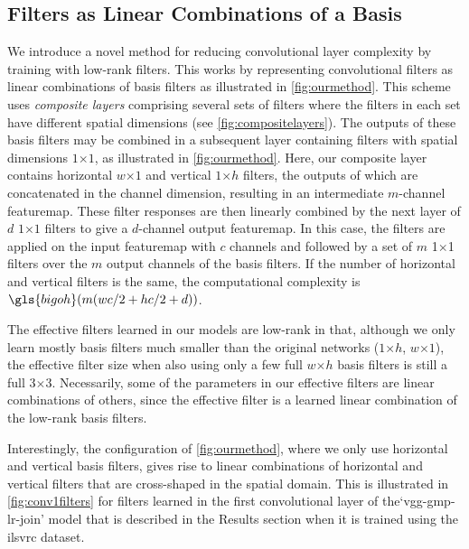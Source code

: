 \documentclass[thesis]{subfiles}
\begin{document}
    \subsection{Filters as Linear Combinations of a Basis}
    We introduce a novel method for reducing convolutional layer complexity by training with low-rank filters. This works by representing convolutional filters as linear combinations of basis filters as illustrated in \cref{fig:ourmethod}. This scheme uses \emph{composite layers} comprising several sets of filters where the filters in each set have different spatial dimensions (see \cref{fig:compositelayers}). The outputs of these basis filters may be combined in a subsequent layer containing filters with spatial dimensions $1$$\times$$1$, as illustrated in \cref{fig:ourmethod}. Here, our composite layer contains horizontal $w$$\times$$1$ and vertical $1$$\times$$h$ filters, the outputs of which are concatenated in the channel dimension, resulting in an intermediate $m$-channel \gls{featuremap}. These filter responses are then linearly combined by the next layer of $d$ $1$$\times$$1$ filters to give a $d$-channel output \gls{featuremap}. In this case, the filters are applied on the input \gls{featuremap} with $c$ channels and followed by a set of $m$ 1$\times$1 filters over the $m$ output channels of the basis filters. If the number of horizontal and vertical filters is the same, the computational complexity is $\gls{bigoh}( m(wc/2 +hc/2 + d))$.
    
    The effective filters learned in our models are low-rank in that, although we only learn mostly basis filters much smaller than the original networks (\eg $1$$\times$$h$, $w$$\times$$1$), the effective filter size when also using only a few full $w$$\times$$h$ basis filters is still a full 3$\times$3. Necessarily, some of the parameters in our effective filters are linear combinations of others, since the effective filter is a learned linear combination of the low-rank basis filters.
    
    Interestingly, the configuration of \cref{fig:ourmethod}, where we only use horizontal and vertical basis filters, gives rise to linear combinations of horizontal and vertical filters that are cross-shaped in the spatial domain. This is illustrated in \cref{fig:conv1filters} for filters learned in the first convolutional layer of the`vgg-gmp-lr-join' model that is described in the Results section when it is trained using the \gls{ilsvrc} dataset.
    
\end{document}
